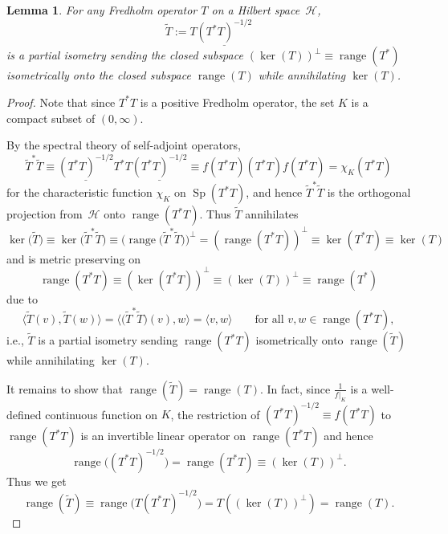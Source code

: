 \documentclass[11pt]{article}
\numberwithin{equation}{section}
\newtheorem{lemma}{Lemma}
\begin{document}
\begin{lemma}\label{Fredholm} For any Fredholm operator $T$ on a Hilbert space~$\mathcal{H}$,
\[
\tilde{T}:=T\underline{( T^{\ast}T) ^{-1/2}}
\]
is a partial isometry sending the closed subspace $( \ker(T)) ^{\perp}\equiv\operatorname{range}( T^{\ast})
$ isometrically onto the closed subspace $\operatorname{range}(T) $ while annihilating $\ker(T) $.
\end{lemma}
\begin{proof}
Note that since $T^{\ast}T$ is a positive Fredholm operator, the set
$K$ is a compact subset of $ ( 0,\infty) $.

By the spectral theory of self-adjoint operators,
\[
\tilde{T}^{\ast}\tilde{T}\equiv\underline{( T^{\ast}T) ^{-1/2}%
}T^{\ast}T\underline{( T^{\ast}T ) ^{-1/2}}\equiv f (
T^{\ast}T ) ( T^{\ast}T ) f ( T^{\ast}T )
=\chi_{K} ( T^{\ast}T )
\]
for the characteristic function $\chi_{K}$ on $\operatorname{Sp} (
T^{\ast}T ) $, and hence $\tilde{T}^{\ast}\tilde{T}$ is the orthogonal
projection from~$\mathcal{H}$ onto $\operatorname{range} ( T^{\ast}T) $. Thus $\tilde{T}$ annihilates
\[
\ker\big(\tilde{T}\big) \equiv\ker\big( \tilde{T}^{\ast}\tilde
{T}\big) \equiv\big( \operatorname{range}\big( \tilde{T}^{\ast}%
\tilde{T}\big) \big) ^{\perp}= ( \operatorname{range} (
T^{\ast}T ) ) ^{\perp}\equiv\ker ( T^{\ast}T )
\equiv\ker ( T )
\]
and is metric preserving on
\[
\operatorname{range}( T^{\ast}T) \equiv( \ker(
T^{\ast}T) ) ^{\perp}\equiv( \ker(T)
) ^{\perp}\equiv\operatorname{range}( T^{\ast})
\]
due to
\[
\big\langle \tilde{T}(v) ,\tilde{T}(w)
\big\rangle =\big\langle \big( \tilde{T}^{\ast}\tilde{T}\big) (
v) ,w\big\rangle =\langle v,w\rangle \qquad \text{for all }v,w\in\operatorname{range}( T^{\ast}T) ,
\]
i.e., $\tilde{T}$ is a partial isometry sending $\operatorname{range} (
T^{\ast}T ) $ isometrically onto $\operatorname{range} ( \tilde
{T} ) $ while annihilating $\ker ( T ) $.

It remains to show that $\operatorname{range}(\tilde{T})
=\operatorname{range}(T) $. In fact, since $\frac{1}{f|_{K}}$
is a well-defined continuous function on $K$, the restriction of $ (
T^{\ast}T ) ^{-1/2}\equiv f ( T^{\ast}T ) $ to
$\operatorname{range}( T^{\ast}T) $ is an invertible linear
operator on $\operatorname{range} ( T^{\ast}T ) $ and hence
\[
\operatorname{range}\big( ( T^{\ast}T ) ^{-1/2}\big)
=\operatorname{range} ( T^{\ast}T ) \equiv ( \ker (T )) ^{\perp}.
\]
Thus we get
\[
\operatorname{range}(\tilde{T}) \equiv\operatorname{range}
\big( T ( T^{\ast}T ) ^{-1/2}\big) =T ( (
\ker(T) ) ^{\perp} ) =\operatorname{range} (T) .\tag*{\qed}
\]
\renewcommand{\qed}{}
\end{proof}
\end{document}
